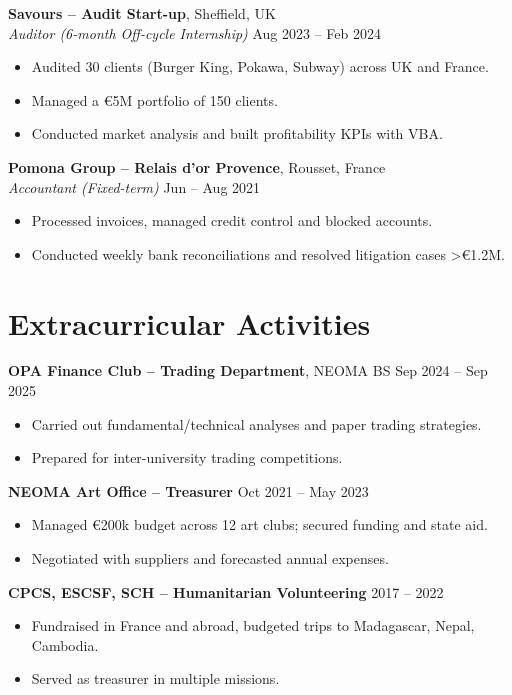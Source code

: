 \documentclass[10pt,a4paper]{article}
\begin{document}
\textbf{Savours – Audit Start-up}, Sheffield, UK \\
\textit{Auditor (6-month Off-cycle Internship)} \hfill Aug 2023 – Feb 2024
\begin{itemize}[leftmargin=1.5em, noitemsep]
    \item Audited 30 clients (Burger King, Pokawa, Subway) across UK and France.
    \item Managed a €5M portfolio of 150 clients.
    \item Conducted market analysis and built profitability KPIs with VBA.
\end{itemize}

\textbf{Pomona Group – Relais d’or Provence}, Rousset, France \\
\textit{Accountant (Fixed-term)} \hfill Jun – Aug 2021
\begin{itemize}[leftmargin=1.5em, noitemsep]
    \item Processed invoices, managed credit control and blocked accounts.
    \item Conducted weekly bank reconciliations and resolved litigation cases >€1.2M.
\end{itemize}

\vspace{0.05cm}

\section*{Extracurricular Activities}

\textbf{OPA Finance Club – Trading Department}, NEOMA BS \hfill Sep 2024 – Sep 2025
\begin{itemize}[leftmargin=1.5em, noitemsep]
    \item Carried out fundamental/technical analyses and paper trading strategies.
    \item Prepared for inter-university trading competitions.
\end{itemize}

\textbf{NEOMA Art Office – Treasurer} \hfill Oct 2021 – May 2023
\begin{itemize}[leftmargin=1.5em, noitemsep]
    \item Managed €200k budget across 12 art clubs; secured funding and state aid.
    \item Negotiated with suppliers and forecasted annual expenses.
\end{itemize}

\textbf{CPCS, ESCSF, SCH – Humanitarian Volunteering} \hfill 2017 – 2022
\begin{itemize}[leftmargin=1.5em, noitemsep]
    \item Fundraised in France and abroad, budgeted trips to Madagascar, Nepal, Cambodia.
    \item Served as treasurer in multiple missions.
\end{itemize}
\end{document}
